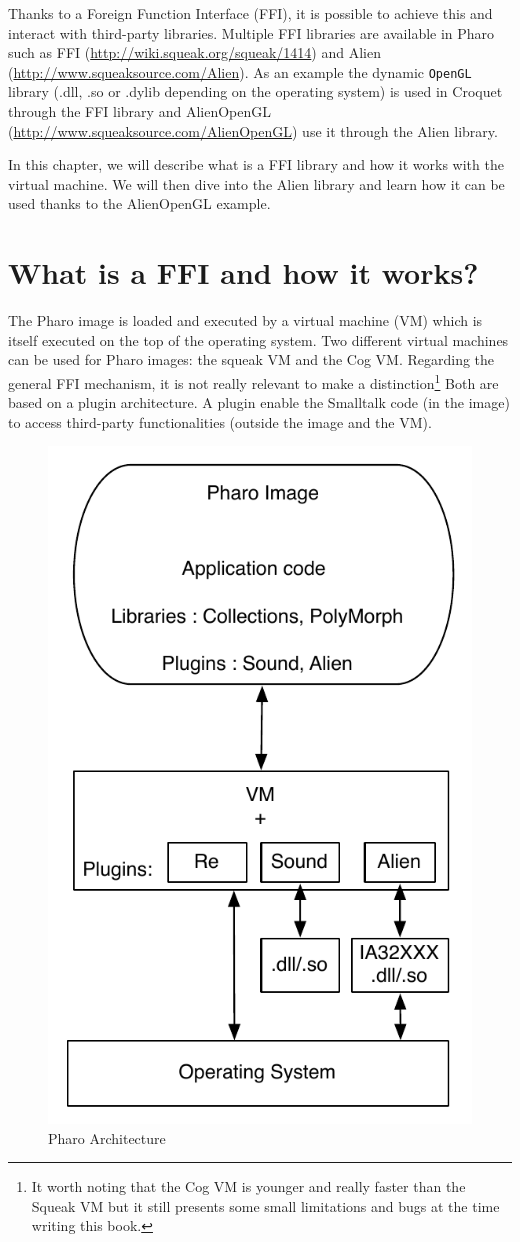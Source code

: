 \documentclass[a4paper,10pt,twoside]{book}
\begin{document}
Thanks to a Foreign Function Interface (FFI), it is possible to achieve this and interact with third-party libraries.
Multiple FFI libraries are available in Pharo such as FFI (\url{http://wiki.squeak.org/squeak/1414}) and Alien (\url{http://www.squeaksource.com/Alien}).
As an example the dynamic \texttt{OpenGL} library (.dll, .so or .dylib depending on the operating system) is used in Croquet through the FFI library and AlienOpenGL (\url{http://www.squeaksource.com/AlienOpenGL}) use it through the Alien library.

In this chapter, we will describe what is a FFI library and how it works with the virtual machine. 
We will then dive into the Alien library and learn how it can be used thanks to the AlienOpenGL example.

\section{What is a FFI and how it works?}

The Pharo image is loaded and executed by a virtual machine (VM) which is itself executed on the top of the operating system. 
Two different virtual machines can be used for Pharo images: the squeak VM and the Cog VM.
Regarding the general FFI mechanism, it is not really relevant to make a distinction\footnote{It worth noting that the Cog VM is younger and really faster than the Squeak VM but it still presents some small limitations and bugs at the time writing this book.} 
Both are based on a plugin architecture.
A plugin enable the Smalltalk code (in the image) to access third-party functionalities (outside the image and the VM).

\begin{figure}[htbp]
	\centering
		\includegraphics[width=0.4\linewidth]{figs/plugins.pdf}
	\caption{Pharo Architecture}
	\label{fig:plugins}
\end{figure}
\end{document}
